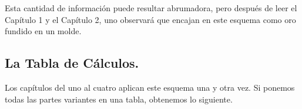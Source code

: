 Esta cantidad de información puede resultar abrumadora, pero después de leer el Capítulo 1 y el Capítulo 2, uno observará que encajan en este esquema como oro fundido en un molde.

\subsection{La Tabla de Cálculos.}

Los capítulos del uno al cuatro aplican este esquema una y otra vez. Si ponemos todas las partes variantes en una tabla, obtenemos lo siguiente.

\bgroup
\begin{table}[H]
\centering
\captionsetup{labelformat=empty}
\caption{(Tabla 1) La Tabla de Cálculos.}
\def\arraystretch{2}

\end{table}
